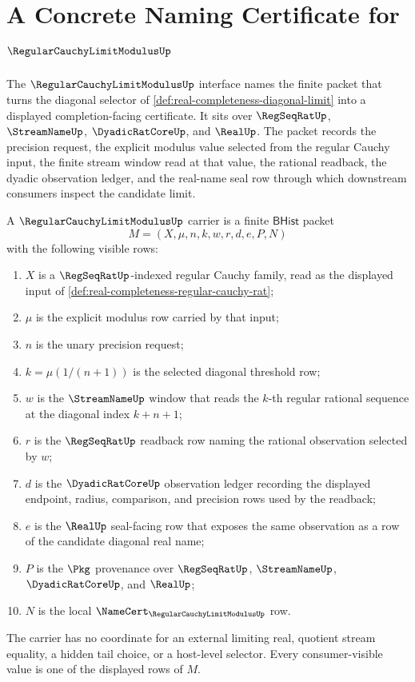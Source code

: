 \chapter{A Concrete Naming Certificate for $\RegularCauchyLimitModulusUp$}
\label{ch:concrete-instances-regular-cauchy-limit-modulus-namecert}

The $\RegularCauchyLimitModulusUp$ interface names the finite packet that turns the diagonal selector of \autoref{def:real-completeness-diagonal-limit} into a displayed completion-facing certificate. It sits over $\RegSeqRatUp$, $\StreamNameUp$, $\DyadicRatCoreUp$, and $\RealUp$. The packet records the precision request, the explicit modulus value selected from the regular Cauchy input, the finite stream window read at that value, the rational readback, the dyadic observation ledger, and the real-name seal row through which downstream consumers inspect the candidate limit.

\begin{definition}
\label{def:regular-cauchy-limit-modulus-carrier}
A $\RegularCauchyLimitModulusUp$ carrier is a finite $\mathsf{BHist}$ packet
$$
M=(X,\mu,n,k,w,r,d,e,P,N)
$$
with the following visible rows:
\begin{enumerate}
\item $X$ is a $\RegSeqRatUp$-indexed regular Cauchy family, read as the displayed input of \autoref{def:real-completeness-regular-cauchy-rat};
\item $\mu$ is the explicit modulus row carried by that input;
\item $n$ is the unary precision request;
\item $k=\mu(1/(n+1))$ is the selected diagonal threshold row;
\item $w$ is the $\StreamNameUp$ window that reads the $k$-th regular rational sequence at the diagonal index $k+n+1$;
\item $r$ is the $\RegSeqRatUp$ readback row naming the rational observation selected by $w$;
\item $d$ is the $\DyadicRatCoreUp$ observation ledger recording the displayed endpoint, radius, comparison, and precision rows used by the readback;
\item $e$ is the $\RealUp$ seal-facing row that exposes the same observation as a row of the candidate diagonal real name;
\item $P$ is the $\Pkg$ provenance over $\RegSeqRatUp$, $\StreamNameUp$, $\DyadicRatCoreUp$, and $\RealUp$;
\item $N$ is the local $\NameCert_{\RegularCauchyLimitModulusUp}$ row.
\end{enumerate}
The carrier has no coordinate for an external limiting real, quotient stream equality, a hidden tail choice, or a host-level selector. Every consumer-visible value is one of the displayed rows of $M$.
\end{definition}

